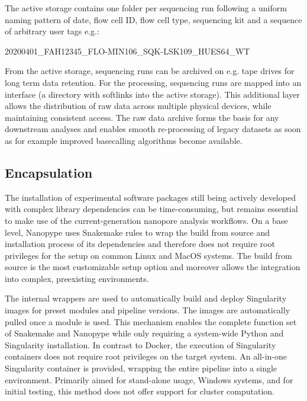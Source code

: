 The active storage contains one folder per sequencing run following a uniform naming pattern of date, flow cell ID, flow cell type, sequencing kit and a sequence of arbitrary user tags e.g.:

\begin{center}
	20200401\_FAH12345\_FLO-MIN106\_SQK-LSK109\_HUES64\_WT
\end{center}

From the active storage, sequencing runs can be archived on e.g. tape drives for long term data retention. For the processing, sequencing runs are mapped into an interface (a directory with softlinks into the active storage). This additional layer allows the distribution of raw data across multiple physical devices, while maintaining consistent access.
The raw data archive forms the basis for any downstream analyses and enables smooth re-processing of legacy datasets as soon as for example improved basecalling algorithms become available.


\subsection{Encapsulation}
\label{subsec:nanopype:encapsulation}
The installation of experimental software packages still being actively developed with complex library dependencies can be time-consuming, but remains essential to make use of the current-generation nanopore analysis workflows. On a base level, Nanopype uses Snakemake rules to wrap the build from source and installation process of its dependencies and therefore does not require root privileges for the setup on common Linux and MacOS systems. The build from source is the most customizable setup option and moreover allows the integration into complex, preexisting environments.

The internal wrappers are used to automatically build and deploy Singularity images for preset modules and pipeline versions. The images are automatically pulled once a module is used. This mechanism enables the complete function set of Snakemake and Nanopype while only requiring a system-wide Python and Singularity installation. In contrast to Docker, the execution of Singularity containers does not require root privileges on the target system.
An all-in-one Singularity container is provided, wrapping the entire pipeline into a single environment. Primarily aimed for stand-alone usage, Windows systems, and for initial testing, this method does not offer support for cluster computation. 

